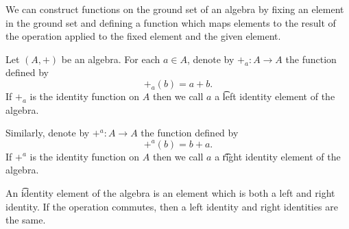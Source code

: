 

We can construct functions on the ground set of an algebra by fixing an element in the ground set and defining a function which maps elements to the result of the operation applied to the fixed element and the given element.


Let $(A, +)$ be an algebra.
For each $a \in A$, denote by $+_a: A \to A$ the function defined by
\[
  +_a(b) = a + b.
\]
If $+_a$ is the identity function on $A$ then we call $a$ a \t{left identity element} of the algebra.

Similarly, denote by $+^a: A \to A$ the function defined by
\[
  +^{a}(b) = b + a.
\]
If $+^a$ is the identity function on $A$ then we call $a$ a \t{right identity element} of the algebra.

An \t{identity element} of the algebra is an element which is both a left and right identity.
If the operation commutes, then a left identity and right identities are the same.

\blankpage
